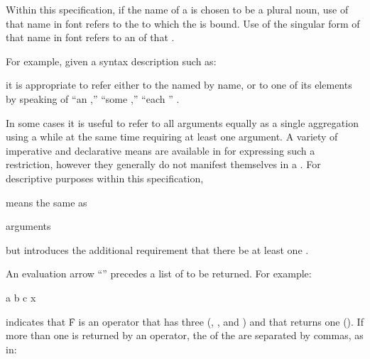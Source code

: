 \endsubsubsubsection%


Within this specification, 
if the name of a  is chosen to be a plural noun,
use of that name in  font refers
to the  to which the  is bound.
Use of the singular form of that name in  font refers 
to an  of that .

For example, given a syntax description such as:

 {{\rest} }

\noindent it is appropriate to refer either to the  named
 by name, or to one of its elements by speaking of ``an ,''
``some ,'' ``each '' \etc.

\endsubsubsubsection%


In some cases it is useful to refer to all arguments equally as a single
aggregation using a  while at the same time
requiring at least one argument.  A variety of imperative and
declarative means are available in  for expressing such a
restriction, however they generally do not manifest themselves in a
.  For descriptive purposes within this specification,

 {{\rest} }

\noindent means the same as

 {{\rest} arguments}

\noindent but introduces the additional requirement that there be 
at least one .

\endsubsubsubsection%


An evaluation arrow ``{\EV}'' precedes a list of  to be returned.
For example:

 {a b c} {x}

\noindent indicates that \f{F} is an operator that has three 
(\ie {}, , and ) and that returns one  (\ie {}).
If more than one  is returned by an operator, the  of the
 are separated by commas, as in:

